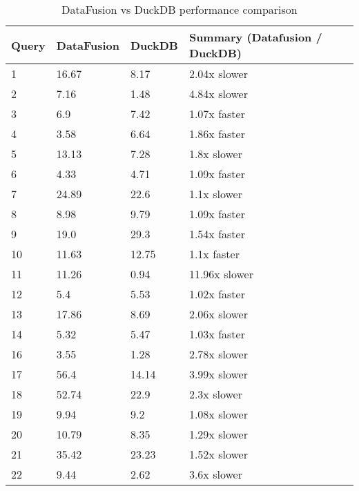 \begin{table}[h]
\centering
\begin{tabular}{|l|l|l|l|}
\hline
Query & DataFusion & DuckDB & Summary (Datafusion / DuckDB) \\
\hline
1 & 16.67 & 8.17 & 2.04x slower \\
\hline
2 & 7.16 & 1.48 & 4.84x slower \\
\hline
3 & 6.9 & 7.42 & 1.07x faster \\
\hline
4 & 3.58 & 6.64 & 1.86x faster \\
\hline
5 & 13.13 & 7.28 & 1.8x slower \\
\hline
6 & 4.33 & 4.71 & 1.09x faster \\
\hline
7 & 24.89 & 22.6 & 1.1x slower \\
\hline
8 & 8.98 & 9.79 & 1.09x faster \\
\hline
9 & 19.0 & 29.3 & 1.54x faster \\
\hline
10 & 11.63 & 12.75 & 1.1x faster \\
\hline
11 & 11.26 & 0.94 & 11.96x slower \\
\hline
12 & 5.4 & 5.53 & 1.02x faster \\
\hline
13 & 17.86 & 8.69 & 2.06x slower \\
\hline
14 & 5.32 & 5.47 & 1.03x faster \\
\hline
16 & 3.55 & 1.28 & 2.78x slower \\
\hline
17 & 56.4 & 14.14 & 3.99x slower \\
\hline
18 & 52.74 & 22.9 & 2.3x slower \\
\hline
19 & 9.94 & 9.2 & 1.08x slower \\
\hline
20 & 10.79 & 8.35 & 1.29x slower \\
\hline
21 & 35.42 & 23.23 & 1.52x slower \\
\hline
22 & 9.44 & 2.62 & 3.6x slower \\
\hline
\end{tabular}
\caption{DataFusion vs DuckDB performance comparison}
\label{table:1}
\end{table}